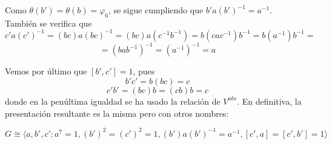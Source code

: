\documentclass[12pt]{article}
\begin{document}
\begin{ejercicio}[2 puntos]
\begin{enumerate}[label=(\alph*)]
\begin{itemize}
\begin{itemize}
\begin{itemize}
                        Como $\theta(b') = \theta(b) = \varphi_6$, se sigue cumpliendo que $b'a(b')^{-1} = a^{-1}$. \\ 

                        También se verifica que $$c'a(c')^{-1} = (bc)a(bc)^{-1} = (bc)a(c^{-1}b^{-1}) = b(cac^{-1})b^{-1} = b(a^{-1})b^{-1} = $$ $$ = (bab^{-1})^{-1} = (a^{-1})^{-1} = a$$

                        Vemos por último que $[b',c'] = 1$, pues $$b'c' = b(bc) = c$$ $$c'b' = (bc)b = (cb)b = c$$ donde en la penúltima igualdad se ha usado la relación de $V^{abs}$. En definitiva, la presentación resultante es la misma pero con otros nombres:
                        
                        $$G \cong \langle a,b',c' : a^7=1, (b')^2 = (c')^2=1, (b')a(b')^{-1} = a^{-1}, [c',a] = [c',b'] = 1 \rangle$$
                    \end{itemize}
                \end{itemize}
            \end{itemize}
        \end{enumerate}
    \end{ejercicio}
\end{document}
